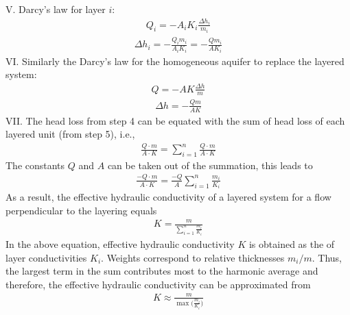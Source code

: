 \documentclass[letterpaper,10pt,english]{jupyterBook}
\begin{document}
\sphinxAtStartPar
V. Darcy’s law for layer \(i\):
\begin{equation*}
\begin{split}Q_i = - A_i K_i \frac{\Delta h_i}{m_i}\end{split}
\end{equation*}\begin{equation*}
\begin{split}\Delta h_i = -\frac{Q_i m_i}{A_i K_i} = - \frac{Q m_i}{A K_i}\end{split}
\end{equation*}
\sphinxAtStartPar
VI. Similarly the Darcy’s law for the homogeneous aquifer to replace the layered system:
\begin{equation*}
\begin{split}Q = - A K \frac{\Delta h}{m}\end{split}
\end{equation*}\begin{equation*}
\begin{split}\Delta h = - \frac{Q m}{A K }\end{split}
\end{equation*}
\sphinxAtStartPar
VII. The head loss from step 4 can be equated with the sum of head loss of each layered unit (from step 5), i.e.,
\begin{equation*}
\begin{split}
\frac{Q\cdot m}{A\cdot K}
=\sum\limits_{i=1}^n\frac{Q\cdot m}{A\cdot K}
\end{split}
\end{equation*}
\sphinxAtStartPar
The constants \(Q\) and \(A\) can be taken out of the summation, this leads to
\begin{equation*}
\begin{split}
\frac{ {-Q}\cdot m}{ A\cdot K}
=\frac{ {-Q}}{A}\sum\limits_{i=1}^n\frac{m_i}{K_i}
\end{split}
\end{equation*}
\sphinxAtStartPar
As a result, the effective hydraulic conductivity of a layered system for a flow perpendicular to the layering equals
\begin{equation*}
\begin{split}
K = \frac{m}{\sum\limits_{i=1}^n\frac{m_i}{K_i}}
\end{split}
\end{equation*}
\sphinxAtStartPar
In the above equation, effective hydraulic conductivity \(K\) is obtained as the  of layer conductivities \(K_i\). Weights
correspond to relative thicknesses \(m_i/m\). Thus, the largest term in the sum contributes most to
the harmonic average and therefore, the effective hydraulic conductivity can be approximated from
\begin{equation*}
\begin{split}
K \approx \frac{m}{{\max\big(\frac{m_i}{K_i}}\big)}
\end{split}
\end{equation*}
\end{document}
